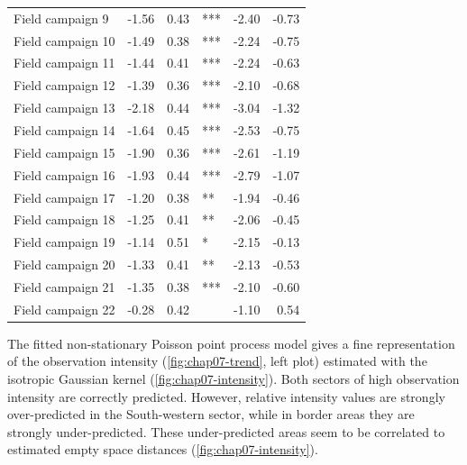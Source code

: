 \begin{table}[!ht]
\begin{tabular}{lrrlrr}
  Field campaign 9	& -1.56 	& 0.43 			& *** 	& -2.40 	& -0.73 \\ 
  Field campaign 10	& -1.49 	& 0.38 			& *** 	& -2.24 	& -0.75 \\ 
  Field campaign 11	& -1.44 	& 0.41 			& *** 	& -2.24 	& -0.63 \\ 
  Field campaign 12	& -1.39 	& 0.36 			& *** 	& -2.10 	& -0.68 \\ 
  Field campaign 13	& -2.18 	& 0.44 			& *** 	& -3.04 	& -1.32 \\ 
  Field campaign 14	& -1.64 	& 0.45 			& *** 	& -2.53 	& -0.75 \\ 
  Field campaign 15	& -1.90 	& 0.36 			& *** 	& -2.61 	& -1.19 \\ 
  Field campaign 16	& -1.93 	& 0.44 			& *** 	& -2.79 	& -1.07 \\ 
  Field campaign 17	& -1.20 	& 0.38 			& ** 	& -1.94 	& -0.46 \\ 
  Field campaign 18	& -1.25 	& 0.41			& ** 	& -2.06 	& -0.45 \\ 
  Field campaign 19	& -1.14 	& 0.51 			& * 	& -2.15 	& -0.13 \\ 
  Field campaign 20	& -1.33 	& 0.41 			& ** 	& -2.13 	& -0.53 \\ 
  Field campaign 21	& -1.35 	& 0.38 			& *** 	& -2.10 	& -0.60 \\ 
  Field campaign 22	& -0.28 	& 0.42 			&    	& -1.10 	& 0.54 	\\ 
  \hline
 \end{tabular}
\end{table}

The fitted non-stationary Poisson point process model gives a fine representation of the observation intensity 
(\autoref{fig:chap07-trend}, left plot) estimated with the isotropic Gaussian kernel 
(\autoref{fig:chap07-intensity}). Both sectors of high observation intensity are correctly predicted. However, 
relative intensity values are strongly over-predicted in the South-western sector, while in border areas they 
are strongly under-predicted. These under-predicted areas seem to be correlated to estimated empty space 
distances (\autoref{fig:chap07-intensity}).

